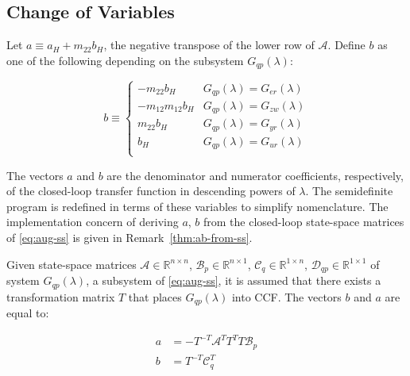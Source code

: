 \subsection{Change of Variables} \label{sec:opt-cv}

Let ${a \equiv a_H + m_{22}b_H}$, the negative transpose of the lower row of $\mathcal{A}$. Define $b$ as one of the following depending on the subsystem $G_{qp}(\lambda)$:

\begin{equation}
	b \equiv
	\begin{cases}
		-m_{22}b_H & G_{qp}(\lambda) = G_{er}(\lambda) \\
		-m_{12}m_{12}b_H & G_{qp}(\lambda) = G_{zw}(\lambda) \\
		m_{22}b_H & G_{qp}(\lambda) = G_{yr}(\lambda) \\
		b_H & G_{qp}(\lambda) = G_{ur}(\lambda) \\
	\end{cases} \label{eq:bs}
\end{equation}

The vectors $a$ and $b$ are the denominator and numerator coefficients, respectively, of the closed-loop transfer function in descending powers of $\lambda$. The semidefinite program is redefined in terms of these variables to simplify nomenclature. The implementation concern of deriving $a$, $b$ from the closed-loop state-space matrices of \autoref{eq:aug-ss} is given in Remark~\ref{thm:ab-from-ss}.

\begin{rem} \label{thm:ab-from-ss}
	Given state-space matrices $\mathcal{A} \in \mathbb{R}^{n \times n}$, $\mathcal{B}_p \in \mathbb{R}^{n \times 1}$, $\mathcal{C}_q \in \mathbb{R}^{1 \times n}$, $\mathcal{D}_{qp} \in \mathbb{R}^{1 \times 1}$ of system $G_{qp}(\lambda)$, a subsystem of \autoref{eq:aug-ss}, it is assumed that there exists a transformation matrix $T$ that places $G_{qp}(\lambda)$ into \gls{CCF}. The vectors $b$ and $a$ are equal to:
	
	\begin{align}
		a &= -T^{-T}\mathcal{A}^TT^TT\mathcal{B}_p \label{eq:as-p-1} \\
		b &= T^{-T}\mathcal{C}_q^T \label{eq:as-p-2}
	\end{align}
\end{rem}
%
%	

